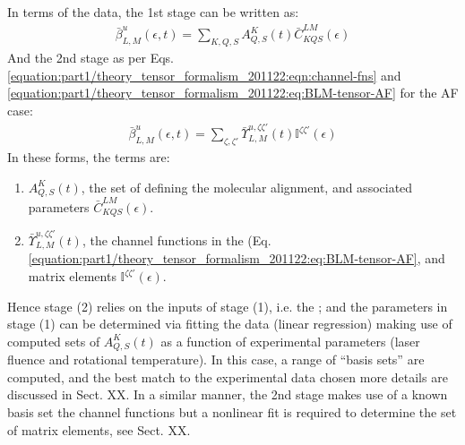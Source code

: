 \documentclass[letterpaper,table,10pt,english]{jupyterBook}
\begin{document}
\sphinxAtStartPar
In terms of the data, the 1st stage can be written as:
\begin{equation}\label{equation:part1/numerics_231122:eqn:beta-convolution-C}
\begin{split}
\bar{\beta}_{L,M}^{u}(\epsilon,t)=\sum_{K,Q,S}A_{Q,S}^{K}(t)\bar{C}_{KQS}^{LM}(\epsilon)
\end{split}
\end{equation}
\sphinxAtStartPar
And the 2nd stage as per Eqs. \eqref{equation:part1/theory_tensor_formalism_201122:eqn:channel-fns} and \eqref{equation:part1/theory_tensor_formalism_201122:eq:BLM-tensor-AF} for the AF case:
\begin{equation*}
\begin{split}
\bar{\beta}_{L,M}^{u}(\epsilon,t)=\sum_{\zeta,\zeta'}\bar{\varUpsilon}_{L,M}^{u,\zeta\zeta'}(t)\mathbb{I}^{\zeta\zeta'}(\epsilon)
\end{split}
\end{equation*}
\sphinxAtStartPar
In these forms, the terms are:
\begin{enumerate}
%
\item {} 
\sphinxAtStartPar
\(A_{Q,S}^{K}(t)\), the set of {\hyperref[\detokenize{backmatter/glossary:term-ADMs}]{}} defining the molecular alignment, and associated parameters \(\bar{C}_{KQS}^{LM}(\epsilon)\).

\item {} 
\sphinxAtStartPar
\(\bar{\varUpsilon}_{L,M}^{u,\zeta\zeta'}(t)\), the channel functions in the {\hyperref[\detokenize{backmatter/glossary:term-AF}]{}} (Eq. \eqref{equation:part1/theory_tensor_formalism_201122:eq:BLM-tensor-AF}, and matrix elements \(\mathbb{I}^{\zeta\zeta'}(\epsilon)\).

\end{enumerate}

\sphinxAtStartPar
Hence stage (2) relies on the inputs of stage (1), i.e. the {\hyperref[\detokenize{backmatter/glossary:term-ADMs}]{}}; and the parameters in stage (1) can be determined via fitting the data (linear regression) making use of computed sets of \(A_{Q,S}^{K}(t)\) as a function of experimental parameters (laser fluence and rotational temperature). In this case, a range of {\hyperref[\detokenize{backmatter/glossary:term-ADMs}]{}} “basis sets” are computed, and the best match to the experimental data chosen \sphinxhyphen{} more details are discussed in Sect. XX. In a similar manner, the 2nd stage makes use of a known basis set \sphinxhyphen{} the channel functions \sphinxhyphen{} but a non\sphinxhyphen{}linear fit is required to determine the set of matrix elements, see Sect. XX.
\end{document}
